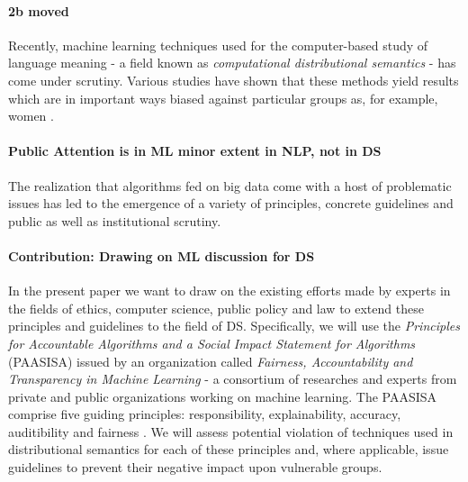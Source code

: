 \documentclass{article}
\begin{document}
\paragraph{2b moved}
Recently, machine learning techniques used for the computer-based study of language meaning - a field known as \emph{computational distributional semantics} - has come under scrutiny.
Various studies have shown that these methods yield results which are in important ways biased against particular groups as, for example, women \cite{google} \cite{wagner2015s}.

\paragraph{Public Attention is in ML minor extent in NLP, not in DS}
The realization that algorithms fed on big data come with a host of problematic issues has led to the emergence of a variety of principles, concrete guidelines and public as well as institutional scrutiny.

\paragraph{Contribution: Drawing on ML discussion for DS}
In the present paper we want to draw on the existing efforts made by experts in the fields of ethics, computer science, public policy and law to extend these principles and guidelines to the field of DS. Specifically, we will use the \emph{Principles for Accountable Algorithms and a Social Impact Statement for Algorithms} (PAASISA) issued by an organization called \emph{Fairness, Accountability and Transparency in Machine Learning} - a consortium of researches and experts from private and public organizations working on machine learning. 
The PAASISA comprise five guiding principles: responsibility, explainability, accuracy, auditibility and fairness \cite{principles}.
We will assess potential violation of techniques used in distributional semantics for each of these principles and, where applicable, issue guidelines to prevent their negative impact upon vulnerable groups. 
\end{document}
